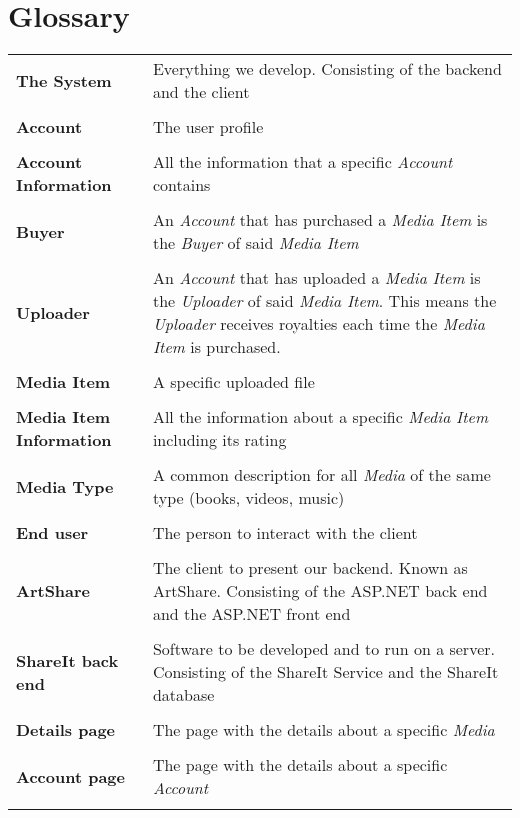 \documentclass[../report.tex]{subfiles}
\begin{document}
\section{Glossary}
\begin{tabular}{l p{10 cm}}
\textbf{The System} & Everything we develop. Consisting of the backend and the client \\ \\
\textbf{Account} & The user profile \\ \\
\textbf{Account Information} & All the information  that a specific \textit{Account} contains\\ \\
\textbf{Buyer} & An \textit{Account} that has purchased a \textit{Media Item} is the \textit{Buyer} of said \textit{Media Item} \\ \\
\textbf{Uploader} & An \textit{Account} that has uploaded a \textit{Media Item} is the \textit{Uploader} of said \textit{Media Item}. This means the \textit{Uploader} receives royalties each time the \textit{Media Item} is purchased. \\ \\
\textbf{Media Item} & A specific uploaded file \\ \\
\textbf{Media Item Information} & All the information  about a specific \textit{Media Item} including its rating \\ \\
\textbf{Media Type} & A common description for all \textit{Media} of the same type (books, videos, music) \\ \\
\textbf{End user} & The person to interact with the client \\ \\
\textbf{ArtShare} & The client to present our backend. Known as ArtShare. Consisting of the ASP.NET back end and the ASP.NET front end \\ \\
\textbf{ShareIt back end} & Software to be developed and to run on a server. Consisting of the ShareIt Service and the ShareIt database \\ \\
\textbf{Details page} & The page with the details about a specific \textit{Media} \\ \\
\textbf{Account page} & The page with the details about a specific \textit{Account} \\ \\
\end{tabular}
\end{document}
